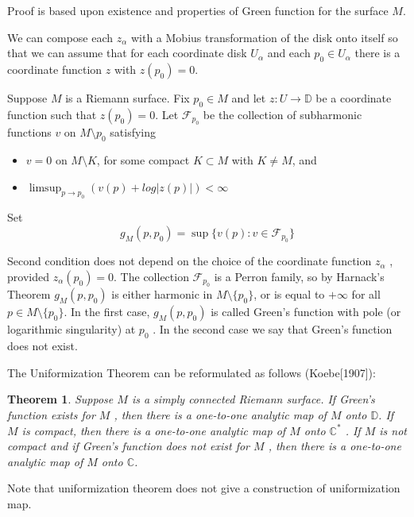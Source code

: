 \documentclass[12pt]{article}
\newtheorem{theorem}{Theorem}
\begin{document}
Proof is based upon existence and properties of Green function for the surface $M$.

 We can
 compose each $z_{\alpha}$ with a Mobius transformation of the disk onto itself so that we can
assume that for each coordinate disk $U_{\alpha}$ and each $p_{0}\in  U_{\alpha}$ there is a coordinate function
$z$ with $z (p_{0} ) = 0$.

     Suppose $M$ is a Riemann surface. Fix $p_{0}\in  M$ and let $z : U\to  \mathbb{D}$ be a coordinate
function such that $z(p_{0} ) = 0$. Let $\mathcal{F}_{p_{0}}$ be the collection of subharmonic
functions $v$ on $M \setminus p_{0}$ satisfying
\begin{itemize}
\item $v = 0$ on $M \setminus K$, for some compact $K\subset M$ with $K \neq M$, and
\item $\limsup_{p\to p_{0}} (v(p) + log |z(p)|) < \infty$
\end{itemize}

Set
\begin{equation}
  \label{eq:104}
  g_{M} (p, p_{0} ) = \sup\{v(p) : v\in \mathcal{F}_{p_{0}} \}
\end{equation}
  
Second condition does not depend on the choice of the coordinate function $z_{\alpha}$ , provided
$z_{\alpha} (p_{0} ) = 0$. The collection $\mathcal{F}_{p_{0}}$ is a Perron family, so by Harnack's
Theorem      $g_M (p, p_{0} )$ is either harmonic in  $M \setminus \{p_{0} \}$, or  is equal to $+\infty$  for
all $p\in M \setminus \{p_{0} \}$.
In the first case, $g_{M} (p, p_{0} )$ is called Green's function with pole (or logarithmic singularity)
at $p_{0}$ . In the second case we say that Green's function does not exist.

The Uniformization Theorem can be reformulated as follows (Koebe[1907]):

\begin{theorem}
  Suppose $M$ is a simply connected Riemann surface. If Green's function exists for $M$ , then there
  is a one-to-one analytic map of $M$ onto $\mathbb{D}$. If $M$ is compact, then there is a
  one-to-one analytic map of $M$ onto $\mathbb{C}^{*}$ . If $M$ is not compact and if Green's
  function does not exist for $M$ , then there is a one-to-one analytic map of $M$ onto
  $\mathbb{C}$.
\end{theorem}

Note that uniformization theorem does not give a construction of uniformization map. 
\end{document}
